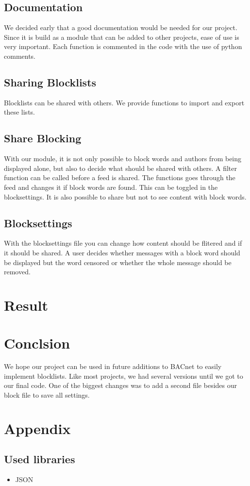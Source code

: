 \documentclass{article}
\begin{document}
\subsection{Documentation}
We decided early that a good documentation would be needed for our project.
Since it is build as a module that can be added to other projects, ease of use is very important.
Each function is commented in the code with the use of python comments. 

\subsection{Sharing Blocklists}
Blocklists can be shared with others. 
We provide functions to import and export these lists.

\subsection{Share Blocking}
With our module, it is not only possible to block words and authors from being displayed alone, but also to decide what should be shared with others.
A filter function can be called before a feed is shared. The functions goes through the feed and changes it if block words are found.
This can be toggled in the blocksettings.
It is also possible to share but not to see content with block words.

\subsection{Blocksettings}
With the blocksettings file you can change how content should be flitered and if it should be shared.
A user decides whether messages with a block word should be displayed but the word censored or whether the whole message should be removed.




\section{Result}






\section{Conclsion}
We hope our project can be used in future additions to BACnet to easily implement blocklists.
Like most projects, we had several versions until we got to our final code.
One of the biggest changes was to add a second file besides our block file to save all settings.


\section{Appendix}
\subsection{Used libraries}
\begin{itemize}
  \item JSON
\end{itemize}
\end{document}
